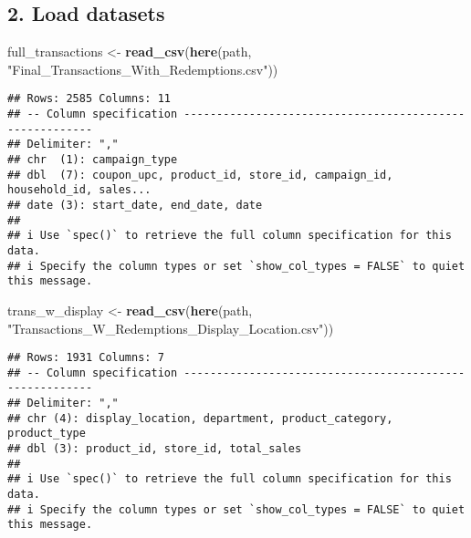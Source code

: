 \documentclass[
]{article}
\newenvironment{Shaded}{\begin{snugshade}}{\end{snugshade}}
\newcommand{\AttributeTok}[1]{\textcolor[rgb]{0.13,0.29,0.53}{#1}}
\newcommand{\ConstantTok}[1]{\textcolor[rgb]{0.56,0.35,0.01}{#1}}
\newcommand{\FunctionTok}[1]{\textcolor[rgb]{0.13,0.29,0.53}{\textbf{#1}}}
\newcommand{\NormalTok}[1]{#1}
\newcommand{\OtherTok}[1]{\textcolor[rgb]{0.56,0.35,0.01}{#1}}
\newcommand{\SpecialCharTok}[1]{\textcolor[rgb]{0.81,0.36,0.00}{\textbf{#1}}}
\newcommand{\StringTok}[1]{\textcolor[rgb]{0.31,0.60,0.02}{#1}}
\begin{document}
\begin{Shaded}
\end{Shaded}

\hypertarget{load-datasets}{%
\subsection{2. Load datasets}\label{load-datasets}}

\begin{Shaded}
\begin{Highlighting}[]
\NormalTok{full\_transactions }\OtherTok{\textless{}{-}} \FunctionTok{read\_csv}\NormalTok{(}\FunctionTok{here}\NormalTok{(path, }\StringTok{"Final\_Transactions\_With\_Redemptions.csv"}\NormalTok{))}
\end{Highlighting}
\end{Shaded}

\begin{verbatim}
## Rows: 2585 Columns: 11
## -- Column specification --------------------------------------------------------
## Delimiter: ","
## chr  (1): campaign_type
## dbl  (7): coupon_upc, product_id, store_id, campaign_id, household_id, sales...
## date (3): start_date, end_date, date
## 
## i Use `spec()` to retrieve the full column specification for this data.
## i Specify the column types or set `show_col_types = FALSE` to quiet this message.
\end{verbatim}

\begin{Shaded}
\begin{Highlighting}[]
\NormalTok{trans\_w\_display }\OtherTok{\textless{}{-}} \FunctionTok{read\_csv}\NormalTok{(}\FunctionTok{here}\NormalTok{(path, }\StringTok{"Transactions\_W\_Redemptions\_Display\_Location.csv"}\NormalTok{))}
\end{Highlighting}
\end{Shaded}

\begin{verbatim}
## Rows: 1931 Columns: 7
## -- Column specification --------------------------------------------------------
## Delimiter: ","
## chr (4): display_location, department, product_category, product_type
## dbl (3): product_id, store_id, total_sales
## 
## i Use `spec()` to retrieve the full column specification for this data.
## i Specify the column types or set `show_col_types = FALSE` to quiet this message.
\end{verbatim}
\end{document}
